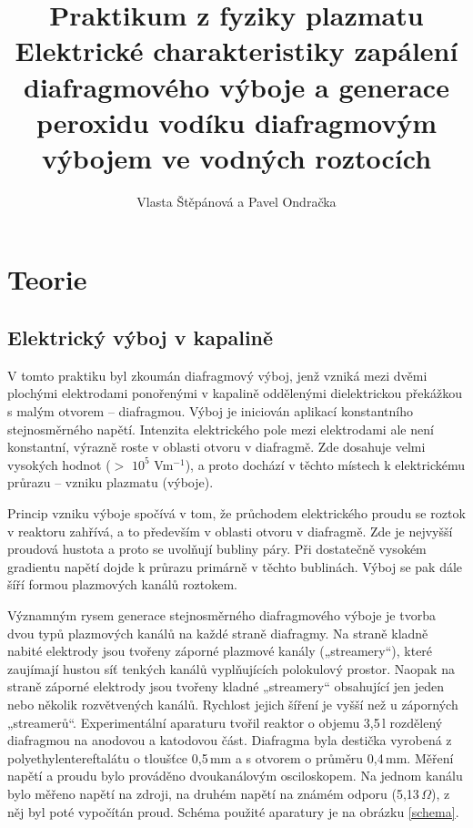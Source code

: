 \documentclass[12pt]{article}
\begin{document}
\title{Praktikum z fyziky plazmatu \\
Elektrické charakteristiky zapálení diafragmového výboje a generace peroxidu vodíku diafragmovým výbojem ve vodných roztocích}
\author{Vlasta Štěpánová a Pavel Ondračka}
\maketitle

\section{Teorie}

\subsection{Elektrický výboj v kapalině}
V tomto praktiku byl zkoumán diafragmový výboj, jenž vzniká mezi dvěmi plochými elektrodami ponořenými v kapalině oddělenými dielektrickou překážkou s malým otvorem -- diafragmou. Výboj je iniciován aplikací
konstantního stejnosměrného napětí. Intenzita elektrického pole mezi elektrodami ale není
konstantní, výrazně roste v oblasti otvoru v diafragmě. Zde dosahuje velmi vysokých hodnot
($>$ $10^5$ Vm$^{-1}$), a proto dochází v těchto místech k elektrickému průrazu -- vzniku plazmatu
(výboje). 

Princip vzniku výboje spočívá v tom, že průchodem elektrického proudu se roztok v reaktoru zahřívá, a to
především v oblasti otvoru v diafragmě. Zde je nejvyšší proudová hustota a proto se uvolňují bubliny páry. Při dostatečně vysokém gradientu napětí dojde k průrazu primárně v těchto bublinách. Výboj se pak dále šíří formou plazmových kanálů roztokem.

Významným rysem generace stejnosměrného diafragmového výboje je tvorba dvou typů plaz\-mo\-vých kanálů na každé
straně diafragmy. Na straně kladně nabité elektrody jsou tvořeny záporné plazmové kanály
(„streamery“), které zaujímají hustou síť tenkých kanálů vyplňujících polokulový prostor.
Naopak na straně záporné elektrody jsou tvořeny kladné „streamery“ obsahující jen jeden
nebo několik rozvětvených kanálů. Rychlost jejich šíření je vyšší než u záporných
„streamerů“. Experimentální aparaturu tvořil reaktor o objemu 3,5\,l rozdělený diafragmou na anodovou a katodovou část. Diafragma byla destička vyrobená z polyethylentereftalátu o tloušťce 0,5\,mm a s otvorem o průměru 0,4\,mm. Měření napětí a proudu bylo prováděno dvoukanálovým osciloskopem. Na jednom kanálu bylo měřeno napětí na zdroji, na druhém napětí na známém odporu (5,13\,$\Omega$), z něj byl poté vypočítán proud. Schéma použité aparatury je na obrázku \ref{schema}.
\end{document}
